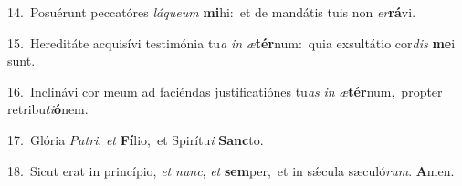 {\numbfont\textcolor{\numbcolor}{14.}}~Posuérunt peccatóres \textit{lá}\-\textit{que}\textit{um} \textbf{mi}\-hi:~\star et de mandátis tuis non \textit{er}\-\textbf{rá}vi.\par
{\numbfont\textcolor{\numbcolor}{15.}}~Hereditáte acquisívi testimónia tu\textit{a} \textit{in} \textit{æ}\-\textbf{tér}num:~\star quia exsultátio cor\textit{dis} \textbf{me}\-i sunt.\par
{\numbfont\textcolor{\numbcolor}{16.}}~Inclinávi cor meum ad faciéndas justificatiónes tu\textit{as} \textit{in} \textit{æ}\-\textbf{tér}num,~\star propter retribu\-\textit{ti}\-\textbf{ó}nem.\par
{\numbfont\textcolor{\numbcolor}{17.}}~Glória \textit{Pa}\-\textit{tri}, \textit{et} \textbf{Fí}\-lio,~\star et Spirítu\textit{i} \textbf{Sanc}\-to.\par
{\numbfont\textcolor{\numbcolor}{18.}}~Sicut erat in princípio, \textit{et} \textit{nunc}\-, \textit{et} \textbf{sem}\-per,~\star et in sǽcula sæculó\-\textit{rum}\-. \textbf{A}\-men.\par
